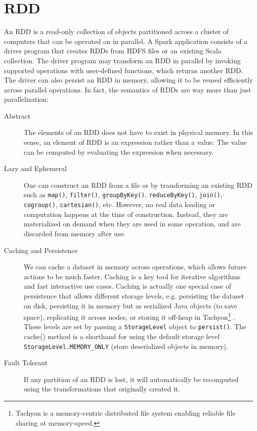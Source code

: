\documentclass[12pt]{book}
\begin{document}
\section{RDD}
An RDD is a read-only collection of objects partitioned across a cluster of computers that can be operated on in parallel. A Spark application consists of a driver program that creates RDDs from HDFS files or an existing Scala collection. The driver program may transform an RDD in parallel by invoking supported operations with user-defined functions, which returns another RDD. The driver can also persist an RDD in memory, allowing it to be reused efficiently across parallel operations.
In fact, the semantics of RDDs are way more than just parallelization:
\begin{description}
\item[Abstract]
The elements of an RDD does not have to exist in physical memory. In this sense, an element of RDD is an expression rather than a value. The value can be computed by evaluating the expression when necessary.
\item[Lazy and Ephemeral]
One can construct an RDD from a file or by transforming an existing RDD such as \texttt{map()}, \texttt{filter()}, \texttt{groupByKey()}, \texttt{reduceByKey()}, \texttt{join()}, \texttt{cogroup()}, \texttt{cartesian()}, etc. However, no real data loading or computation happens at the time of construction. Instead, they are materialized on demand when they are used in some operation, and are discarded from memory after use.
\item[Caching and Persistence]
We can cache a dataset in memory across operations, which allows future actions to be much faster. Caching is a key tool for iterative algorithms and fast interactive use cases. Caching is actually one special case of  persistence that allows different storage levels, e.g. persisting the dataset on disk, persisting it in memory but as serialized Java objects (to save space), replicating it across nodes, or storing it off-heap in Tachyon\footnote{Tachyon is a memory-centric distributed file system enabling reliable file sharing at memory-speed.} \cite{Tachyon}. These levels are set by passing a \texttt{StorageLevel} object to \texttt{persist()}. The cache() method is a shorthand for using the default storage level \texttt{StorageLevel.MEMORY\_ONLY} (store deserialized objects in memory).
\item[Fault Tolerant]
If any partition of an RDD is lost, it will automatically be recomputed using the transformations that originally created it.
\end{description}
\end{document}
